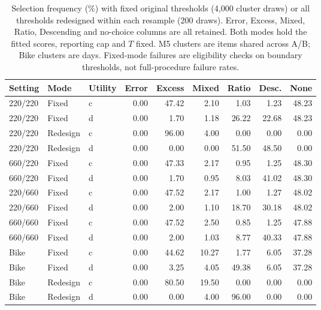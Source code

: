 \begin{table}[t]\centering\scriptsize
\caption{Selection frequency (\%) with fixed original thresholds (4,000 cluster draws) or all thresholds redesigned within each resample (200 draws). Error, Excess, Mixed, Ratio, Descending and no-choice columns are all retained. Both modes hold the fitted scores, reporting cap and $T$ fixed. M5 clusters are items shared across A/B; Bike clusters are days. Fixed-mode failures are eligibility checks on boundary thresholds, not full-procedure failure rates.}\label{tab:v7-frequencies}
\begin{tabular}{lllrrrrrr}\toprule
Setting & Mode & Utility & Error & Excess & Mixed & Ratio & Desc. & None\\\midrule
220/220 & Fixed & c & 0.00 & 47.42 & 2.10 & 1.03 & 1.23 & 48.23 \\
220/220 & Fixed & d & 0.00 & 1.70 & 1.18 & 26.22 & 22.68 & 48.23 \\
220/220 & Redesign & c & 0.00 & 96.00 & 4.00 & 0.00 & 0.00 & 0.00 \\
220/220 & Redesign & d & 0.00 & 0.00 & 0.00 & 51.50 & 48.50 & 0.00 \\
660/220 & Fixed & c & 0.00 & 47.33 & 2.17 & 0.95 & 1.25 & 48.30 \\
660/220 & Fixed & d & 0.00 & 1.70 & 0.95 & 8.03 & 41.02 & 48.30 \\
220/660 & Fixed & c & 0.00 & 47.52 & 2.17 & 1.00 & 1.27 & 48.02 \\
220/660 & Fixed & d & 0.00 & 2.00 & 1.10 & 18.70 & 30.18 & 48.02 \\
660/660 & Fixed & c & 0.00 & 47.52 & 2.50 & 0.85 & 1.25 & 47.88 \\
660/660 & Fixed & d & 0.00 & 2.00 & 1.03 & 8.77 & 40.33 & 47.88 \\
Bike & Fixed & c & 0.00 & 44.62 & 10.27 & 1.77 & 6.05 & 37.28 \\
Bike & Fixed & d & 0.00 & 3.25 & 4.05 & 49.38 & 6.05 & 37.28 \\
Bike & Redesign & c & 0.00 & 80.50 & 19.50 & 0.00 & 0.00 & 0.00 \\
Bike & Redesign & d & 0.00 & 0.00 & 4.00 & 96.00 & 0.00 & 0.00 \\
\bottomrule\end{tabular}\end{table}
